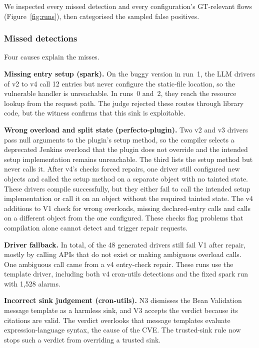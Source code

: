 \documentclass[sigconf]{acmart}
\begin{document}
We inspected every missed detection and every configuration's GT-relevant flows (Figure~\ref{fig:runs}), then categorised the sampled false positives.

\subsubsection{Missed detections}
Four causes explain the misses.

\nopagebreak[4]
\textbf{Missing entry setup (spark).} On the buggy version in run~1, the LLM drivers of v2 to v4 call 12 entries but never configure the static-file location, so the vulnerable handler is unreachable. In runs~0 and~2, they reach the resource lookup from the request path. The judge rejected these routes through library code, but the witness confirms that this sink is exploitable.

\textbf{Wrong overload and split state (perfecto-plugin).} Two v2 and v3 drivers pass null arguments to the plugin's setup method, so the compiler selects a deprecated Jenkins overload that the plugin does not override and the intended setup implementation remains unreachable. The third lists the setup method but never calls it. After v4's checks forced repairs, one driver still configured new objects and called the setup method on a separate object with no tainted state. These drivers compile successfully, but they either fail to call the intended setup implementation or call it on an object without the required tainted state. The v4 additions to V1 check for wrong overloads, missing declared-entry calls and calls on a different object from the one configured. These checks flag problems that compilation alone cannot detect and trigger repair requests.

\textbf{Driver fallback.} In total, \FallbackDrivers{} of the 48 generated drivers still fail V1 after repair, mostly by calling APIs that do not exist or making ambiguous overload calls. One ambiguous call came from a v4 entry-check repair. These runs use the template driver, including both v4 cron-utils detections and the fixed spark run with 1,528 alarms.

\textbf{Incorrect sink judgement (cron-utils).} N3 dismisses the Bean Validation message template as a harmless sink, and V3 accepts the verdict because its citations are valid. The verdict overlooks that message templates evaluate expression-language syntax, the cause of the CVE. The trusted-sink rule now stops such a verdict from overriding a trusted sink.
\end{document}
